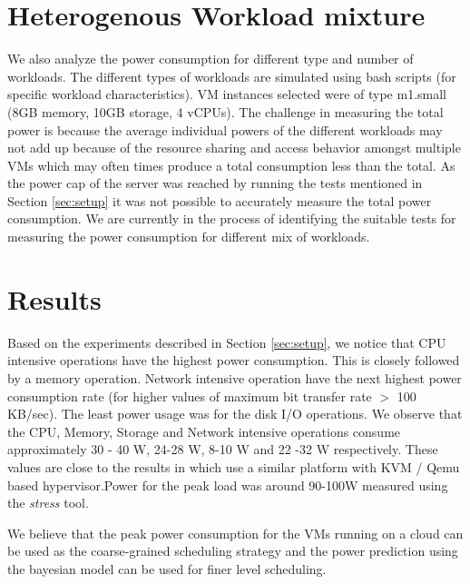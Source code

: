 \documentclass[singlecolumn,letterpaper,12pt]{article}
\begin{document}
\section{Heterogenous Workload mixture}
\label{sec:hetro-workload-mix}
We also analyze the power consumption for different type and number of workloads. The different types of workloads are simulated using bash scripts (for specific workload characteristics). VM instances selected were of type m1.small (8GB memory, 10GB storage, 4 vCPUs). The challenge in measuring the total power is because the average individual powers of the different workloads may not add up because of the resource sharing and access behavior amongst multiple VMs which may often times produce a total consumption less than the total. As the power cap of the server was reached by running the tests mentioned in Section \ref{sec:setup} it was not possible to accurately measure the total power consumption. We are currently in the process of identifying the suitable tests for measuring the power consumption for different mix of workloads.


\section{Results}
\label{sec:results}
Based on the experiments described in Section \ref{sec:setup}, we notice that CPU intensive operations have the highest power consumption. This is closely followed by a memory operation. Network intensive operation have the next highest power consumption rate (for higher values of maximum bit transfer rate $>$ 100 KB/sec). The least power usage was for the disk I/O operations. We observe that the CPU, Memory, Storage and Network intensive operations consume approximately 30 - 40 W, 24-28 W, 8-10 W and 22 -32 W respectively. These values are close to the results in \cite{vm-power-meter} which use a similar platform with KVM / Qemu based hypervisor.Power for the peak load was around 90-100W measured using the \emph{stress} tool.

We believe that the peak power consumption for the VMs running on a cloud can be used as the coarse-grained scheduling strategy and the power prediction using the bayesian model can be used for finer level scheduling.
\end{document}
